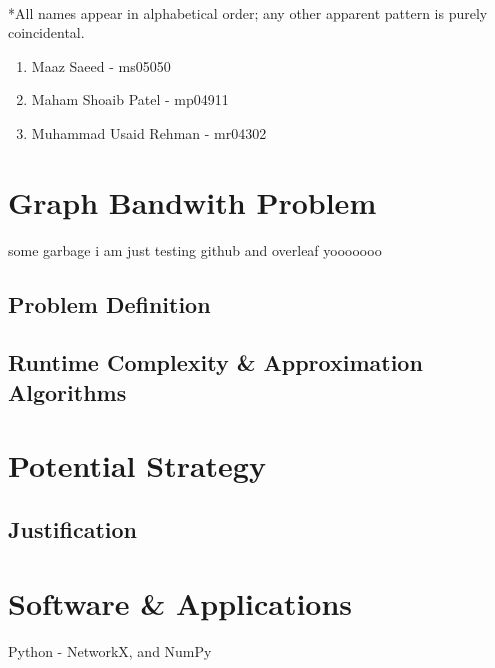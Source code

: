 \documentclass[answers]{exam}
\begin{document}
\paragraph{}
*All names appear in alphabetical order; any other apparent pattern is purely coincidental.
\begin{enumerate}
    \item Maaz Saeed - ms05050
    \item Maham Shoaib Patel - mp04911
    \item Muhammad Usaid Rehman - mr04302
\end{enumerate}

\section{Graph Bandwith Problem}

some garbage i am just testing github and overleaf yooooooo



\subsection{Problem Definition}
\subsection{Runtime Complexity \& Approximation Algorithms}

\section{Potential Strategy}

\subsection{Justification}

\section{Software \& Applications}
Python - NetworkX, and NumPy
\end{document}
